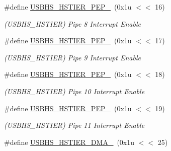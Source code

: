 \begin{DoxyCompactItemize}
\mbox{\label{group__SAME70__USBHS_ga4b7e9566a64821243147c3950f3a60d5}} 
\#define \mbox{\hyperlink{group__SAME70__USBHS_ga4b7e9566a64821243147c3950f3a60d5}{U\+S\+B\+H\+S\+\_\+\+H\+S\+T\+I\+E\+R\+\_\+\+P\+E\+P\+\_}}~(0x1u $<$$<$ 16)
\begin{DoxyCompactList}\small\item\em (U\+S\+B\+H\+S\+\_\+\+H\+S\+T\+I\+ER) Pipe 8 Interrupt Enable \end{DoxyCompactList}\item 
\mbox{\label{group__SAME70__USBHS_ga5e5d8101cfdc2396ce20e75be173b1f7}} 
\#define \mbox{\hyperlink{group__SAME70__USBHS_ga5e5d8101cfdc2396ce20e75be173b1f7}{U\+S\+B\+H\+S\+\_\+\+H\+S\+T\+I\+E\+R\+\_\+\+P\+E\+P\+\_}}~(0x1u $<$$<$ 17)
\begin{DoxyCompactList}\small\item\em (U\+S\+B\+H\+S\+\_\+\+H\+S\+T\+I\+ER) Pipe 9 Interrupt Enable \end{DoxyCompactList}\item 
\mbox{\label{group__SAME70__USBHS_ga0624c6ef33a6f52bc5e59b739587c8b9}} 
\#define \mbox{\hyperlink{group__SAME70__USBHS_ga0624c6ef33a6f52bc5e59b739587c8b9}{U\+S\+B\+H\+S\+\_\+\+H\+S\+T\+I\+E\+R\+\_\+\+P\+E\+P\+\_}}~(0x1u $<$$<$ 18)
\begin{DoxyCompactList}\small\item\em (U\+S\+B\+H\+S\+\_\+\+H\+S\+T\+I\+ER) Pipe 10 Interrupt Enable \end{DoxyCompactList}\item 
\mbox{\label{group__SAME70__USBHS_ga2613a3c81d45c37427721970885786cb}} 
\#define \mbox{\hyperlink{group__SAME70__USBHS_ga2613a3c81d45c37427721970885786cb}{U\+S\+B\+H\+S\+\_\+\+H\+S\+T\+I\+E\+R\+\_\+\+P\+E\+P\+\_}}~(0x1u $<$$<$ 19)
\begin{DoxyCompactList}\small\item\em (U\+S\+B\+H\+S\+\_\+\+H\+S\+T\+I\+ER) Pipe 11 Interrupt Enable \end{DoxyCompactList}\item 
\mbox{\label{group__SAME70__USBHS_ga969f463accb76d2fa7e9a36fab75e907}} 
\#define \mbox{\hyperlink{group__SAME70__USBHS_ga969f463accb76d2fa7e9a36fab75e907}{U\+S\+B\+H\+S\+\_\+\+H\+S\+T\+I\+E\+R\+\_\+\+D\+M\+A\+\_}}~(0x1u $<$$<$ 25)
$$
\end{DoxyCompactItemize}
